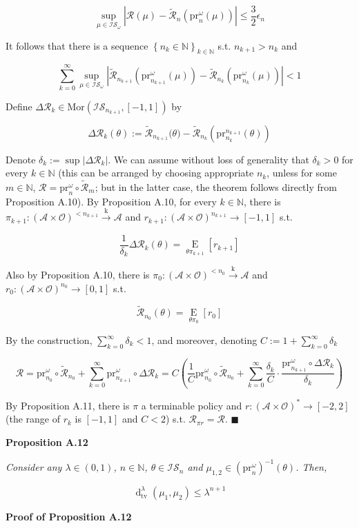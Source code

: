 \documentclass[a4paper]{article}
\newcommand{\Co}[1]{}
\newcommand{\AP}[1]{\left(#1\right)}
\newcommand{\AB}[1]{\left[#1\right]}
\newcommand{\AC}[1]{\left\{#1\right\}}
\newcommand{\Abs}[1]{\left\vert #1 \right\vert}
\newcommand{\Ea}[2]{\underset{#1}{\operatorname{E}}\AB{#2}}
\newcommand{\Dtv}{\operatorname{d}_{\text{tv}}}
\newcommand{\Nats}{\mathbb{N}}
\newcommand{\Mor}{\mathrm{Mor}}
\newcommand{\K}{\xrightarrow{\mathrm{k}}}
\newcommand{\A}{\mathcal{A}}
\newcommand{\Ob}{\mathcal{O}}
\newcommand{\AO}{\AP{\A\times\Ob}}
\newcommand{\FH}{\AO^*}
\newcommand{\R}{\mathcal{R}}
\newcommand{\IS}{\mathcal{IS}}
\newcommand{\Prj}{\mathrm{pr}}
\newcommand{\Prjo}{\mathrm{pr}^\omega_n}
\begin{document}
$$\sup_{\mu\in\IS_\omega}\Abs{\R(\mu)-\tilde{\R}_n\AP{\Prjo(\mu)}}\leq\frac{3}{2}\epsilon_n$$

It follows that there is a sequence $\AC{n_k\in\Nats}_{k\in\Nats}$ s.t. $n_{k+1}>n_k$ and

$$\sum_{k=0}^\infty \sup_{\mu\in\IS_\omega}\Abs{\tilde{\R}_{n_{k+1}}\AP{\Prj^\omega_{n_{k+1}}\AP{\mu}}-\tilde{\R}_{n_k}\AP{\Prj^\omega_{n_k}(\mu)}}<1$$

Define $\Delta\R_k\in\Mor\AP{\IS_{n_{k+1}},[-1,1]}$ by

$$\Delta\R_k(\theta):=\tilde{\R}_{n_{k+1}}\Big(\theta\Big)-\tilde{\R}_{n_k}\AP{\Prj^{n_{k+1}}_{n_k}(\theta)}$$

Denote $\delta_k:=\sup\Abs{\Delta\R_k}$. We can assume without loss of generality that $\delta_k>0$ for every $k\in\Nats$ (this can be arranged by choosing appropriate $n_k$, unless for some $m\in\Nats$, $\R=\Prjo\circ\tilde{\R}_m$; but in the latter case, the theorem follows directly from Proposition A.10). By Proposition A.10, for every $k\in\Nats$, there is $\pi_{k+1}:\AO^{<n_{k+1}}\K\A$ and $r_{k+1}:\AO^{n_{k+1}}\rightarrow\AB{-1,1}$ s.t.

$$\frac{1}{\delta_k}\Delta\R_k(\theta)=\Ea{\theta\pi_{k+1}}{r_{k+1}}$$

Also by Proposition A.10, there is $\pi_0:\AO^{<n_0}\K\A$ and $r_0:\AO^{n_0}\rightarrow\AB{0,1}$ s.t.

$$\tilde{\R}_{n_0}(\theta)=\Ea{\theta\pi_{0}}{r_{0}}$$

By the construction, $\sum_{k=0}^\infty\delta_k < 1$, and moreover, denoting $C:=1+\sum_{k=0}^\infty\delta_k$

$$\R=\Prj^\omega_{n_0}\circ\tilde{\R}_{n_0}+\sum_{k=0}^\infty\Prj^\omega_{n_{k+1}}\circ\Delta\R_k=C\AP{\frac{1}{C}\Prj^\omega_{n_0}\circ\tilde{\R}_{n_0}+\sum_{k=0}^\infty\frac{\delta_k}{C}\cdot\frac{\Prj^\omega_{n_{k+1}}\circ\Delta\R_k}{\delta_k}}$$

By Proposition A.11, there is  $\pi$ a terminable policy and $r:\FH\rightarrow[-2,2]$ (the range of $r_k$ is $[-1,1]$ and $C<2$) s.t. $\R_{\pi r}= \R$. $\blacksquare$

\textbf{Proposition A.12}\Co{b}

\textit{Consider any $\lambda\in(0,1)$, $n\in\Nats$, $\theta\in\IS_n$ and $\mu_{1,2}\in\AP{\Prjo}^{-1}(\theta)$. Then,}\Co{i}

$$\Dtv^\lambda\AP{\mu_1,\mu_2} \leq \lambda^{n+1}$$

\textbf{Proof of Proposition A.12}\Co{b}
\end{document}
